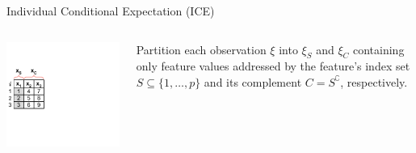 \documentclass[11pt,compress,t,notes=noshow, aspectratio=169, xcolor=table]{beamer}
\begin{document}
\begin{vbframe}{Individual Conditional Expectation (ICE)}

\begin{columns}[T]
\begin{column}{0.18\textwidth} %
\includegraphics[page=1, trim=0cm 0.35cm 4.53cm 0.35cm, clip, width=\textwidth]{figure_man/ice_plot_demo}
\end{column}
\begin{column}{0.82\textwidth}
Partition each observation $\xi$ into $\xi_S$ and $\xi_C$ containing only feature values addressed by the feature's index set $S \subseteq \{1, \dots, p\}$ and its complement $C = S^\complement$, respectively.
\lz


\end{column}
\end{columns}
\end{vbframe}
\end{document}
